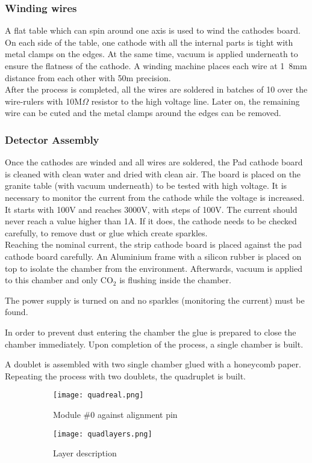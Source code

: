 \subsubsection{Winding wires}
A flat table which can spin around one axis is used to wind the cathodes board.
On each side of the table, one cathode with all the internal parts is tight with metal clamps on
the edges.
At the same time, vacuum is applied underneath to ensure the flatness of the cathode. 
A winding machine places each wire at \unit{1.8}{mm} distance from each other with
\unit{50}{\micro m} precision.\\ 
After the process is completed, all the wires are soldered in batches of 10
over the wire-rulers with \unit{10}{M$\Omega$} resistor to the high voltage line.
Later on, the remaining wire can be cuted and the metal clamps around the edges can be removed. 

\subsubsection{Detector Assembly}

Once the cathodes are winded and all wires are soldered, the Pad cathode board is cleaned with clean water and dried with clean air.
The board is placed on the granite table (with vacuum underneath) to be tested with high voltage.
It is necessary to monitor the current from the cathode while the voltage is increased.
It starts with 100V and reaches 3000V, with steps of  100V.  The current should never reach a value higher than
\unit{1}{\micro A}. If it does, the cathode needs to be checked carefully, to remove dust or glue which create sparkles.\\ 
Reaching the nominal current, the strip cathode board is placed against the pad cathode board
carefully.
An Aluminium frame with a silicon rubber is placed on top to isolate the chamber from the environment.
Afterwards, vacuum is applied to this chamber and only CO$_2$ is flushing inside the chamber.\par
The power supply is turned on and no sparkles (monitoring the current) must be found.\par
In order to prevent dust entering the chamber the glue is prepared to close the chamber immediately.
Upon completion of the process, a single chamber is built.\par
A doublet is assembled with two single chamber glued with a honeycomb paper. Repeating the process with two doublets,
the quadruplet is built.
\begin{figure}[ht]
\centering
\hspace*{\fill}
{\begin{subfigure}[b]{0.55\textwidth}
\texttt{[image: quadreal.png]}
\caption{Module \#0 against alignment pin}\label{}
\end{subfigure}
}\hfill
{\begin{subfigure}[b]{0.35\textwidth}
\texttt{[image: quadlayers.png]}
\caption{Layer description}\label{quad}
\end{subfigure}
}\hspace*{\fill}
\caption{}
\end{figure}


